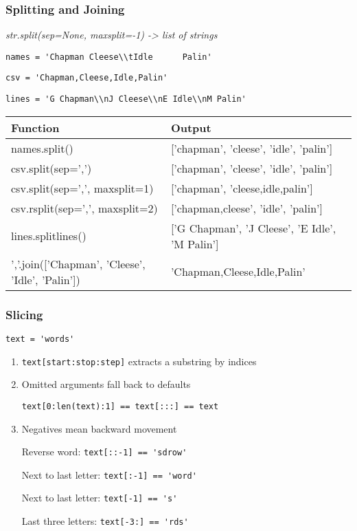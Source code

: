 \documentclass{beamer}
\begin{document}
%
%
\begin{frame}
  \frametitle{Splitting and Joining}

  \textit{str.split(sep=None, maxsplit=-1) -> list of strings}

  \lstinline{names = 'Chapman Cleese\\tIdle      Palin'}

  \lstinline{csv = 'Chapman,Cleese,Idle,Palin'}

  \lstinline{lines = 'G Chapman\\nJ Cleese\\nE Idle\\nM Palin'}
 
  \begin{table}
    \begin{tabular}{l | l}
    Function & Output \\
    \hline
    names.split() & ['chapman', 'cleese', 'idle', 'palin'] \\
    csv.split(sep=',') & ['chapman', 'cleese', 'idle', 'palin'] \\
    csv.split(sep=',', maxsplit=1) & ['chapman', 'cleese,idle,palin'] \\
    csv.rsplit(sep=',', maxsplit=2) & ['chapman,cleese', 'idle', 'palin'] \\
    lines.splitlines() & ['G Chapman', 'J Cleese', 'E Idle', 'M Palin'] \\
    \hline
    ','.join(['Chapman', 'Cleese', 'Idle', 'Palin']) & 'Chapman,Cleese,Idle,Palin'
    \end{tabular}
  \end{table}
\end{frame}


%
%
\begin{frame}
  \frametitle{Slicing}

  \lstinline{text = 'words'}

  \begin{enumerate}
    \item \lstinline{text[start:stop:step]} extracts a substring by indices
    \item Omitted arguments fall back to defaults

      \lstinline{text[0:len(text):1] == text[:::] == text}

    \item Negatives mean backward movement
    
      Reverse word: \lstinline{text[::-1] == 'sdrow'}

      Next to last letter: \lstinline{text[:-1] == 'word'}

      Next to last letter: \lstinline{text[-1] == 's'}

      Last three letters: \lstinline{text[-3:] == 'rds'}



  \end{enumerate}

\end{frame}
\end{document}

